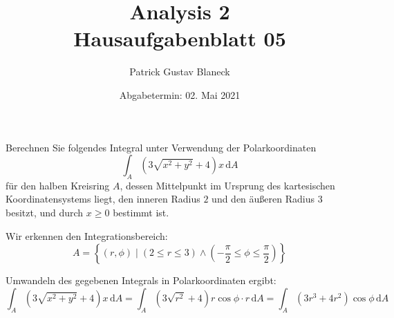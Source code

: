 \documentclass[answers]{exam}
\title{Analysis 2 \\ \large{Hausaufgabenblatt 05}}
\author{Patrick Gustav Blaneck}
\date{Abgabetermin: 02. Mai 2021}
\renewcommand{\d}{\,\mathrm{d}}
\begin{document}
\begin{questions}
    \setcounter{question}{1}
    \question
    Berechnen Sie folgendes Integral unter Verwendung der Polarkoordinaten
    $$
        \int_A \left(3\sqrt{x^2 + y^2} + 4\right)x \d A
    $$
    für den halben Kreisring $A$, dessen Mittelpunkt im Ursprung des kartesischen Koordinatensystems liegt, den inneren Radius $2$ und den äußeren Radius $3$ besitzt, und durch $x\geq 0$ bestimmt ist.
    \begin{solution}
        \begin{center}
        \end{center}

        Wir erkennen den Integrationsbereich:
        $$
            A = \left\{(r, \phi) \mid (2 \leq r \leq 3 ) \land \left(-\frac{\pi}{2} \leq \phi \leq \frac{\pi}{2}\right)\right\}
        $$

        Umwandeln des gegebenen Integrals in Polarkoordinaten ergibt:
        $$
            \int_A \left(3\sqrt{x^2 + y^2} + 4\right)x \d A = \int_A \left(3\sqrt{r^2} + 4\right)r\cos\phi \cdot r \d A = \int_A \left( 3r^3+4r^2 \right)\cos\phi \d A
        $$


\end{solution}
\end{questions}
\end{document}
